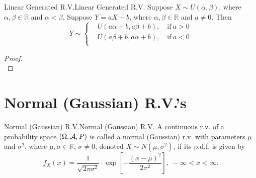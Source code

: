 \documentclass{elegantbook}
\begin{document}
\begin{theorem}{Linear Generated R.V.}{Linear Generated R.V.}
Suppose $X\sim U(\alpha,\beta)$, where $\alpha,\beta\in\mathbb{R}$ and $\alpha<\beta$. Suppose $Y=aX+b$, where $\alpha,\beta\in\mathbb{R}$ and $a\neq0$. Then
\[Y\sim\left\{ \begin{aligned}
&U\left( a\alpha + b,a\beta + b \right),\quad\mathrm{\text{if}}\ a > 0 \\
&U\left( a\beta + b,a\alpha + b \right),\quad\mathrm{\text{if}}\ a < 0 \\
\end{aligned} \right.\]
\end{theorem}

\begin{proof}
\\[4cm]\vspace{0.01cm}
\end{proof}

\section{Normal (Gaussian) R.V.'s}

\begin{definition}{Normal (Gaussian) R.V.}{Normal (Gaussian) R.V.}
A continuous r.v. of a probability space $(\Omega,\mathcal{A}, P)$ is called a normal (Gaussian) r.v. with parameters $\mu$ and $\sigma^2$, where $\mu,\sigma\in\mathbb{R}$, $\sigma\neq0$, denoted $X\sim N(\mu,\sigma^2)$, if its p.d.f. is given by
$$
f_X(x)=\frac{1}{\sqrt{2\pi\sigma^2}}\cdot\exp\left[{-\frac{(x-\mu)^2}{2\sigma^2}}\right],\ -\infty<x<\infty.
$$
\end{definition}
\end{document}
